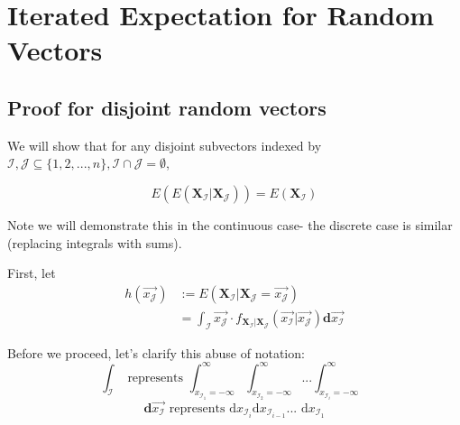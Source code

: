 \documentclass[paper=a4, fontsize=11pt]{scrartcl} %
\numberwithin{equation}{section} %
\numberwithin{figure}{section} %
\numberwithin{table}{section} %
\begin{document}

\section{Iterated Expectation for Random Vectors}

\subsection{Proof for disjoint random vectors}

We will show that for any disjoint subvectors indexed by ${\mathcal{I}}, {\mathcal{J}} \subseteq \{1, 2, ..., n\}, {\mathcal{I}} \cap {\mathcal{J}} = \emptyset$,

\[E(E(\mathbf{X_{\mathcal{I}}} | \mathbf{X_{\mathcal{J}}})) = E(\mathbf{X_{\mathcal{I}}})\]

Note we will demonstrate this in the continuous case- the discrete case is similar (replacing integrals with sums). 

First, let
\begin{align*}
h(\vec{x_{\mathcal{J}}}) &:= E(\mathbf{X_{\mathcal{I}}} | \mathbf{X_{\mathcal{J}}} = \vec{x_{\mathcal{J}}})\\
   &= \int_{\mathbf{{\mathcal{I}}}} \vec{x_{\mathcal{J}}} \cdot f_{ \mathbf{X_{\mathcal{I}} | X_{\mathcal{J}}}}(\vec{x_{\mathcal{I}}} | \vec{x_{\mathcal{J}}}) \mathbf{d}\vec{x_{\mathcal{I}}}
\end{align*}

Before we proceed, let's clarify this abuse of notation:
\[ \int_{\mathbf{{\mathcal{I}}}} \textrm{ represents  } \int_{x_{{\mathcal{I}}_{1}} = -\infty}^\infty \int_{x_{{\mathcal{I}}_{2}} = -\infty}^\infty ... \int_{x_{{\mathcal{I}}_{i}} = -\infty}^\infty \]
\[ \mathbf{d}\vec{x_{\mathcal{I}}} \textrm{ represents  } \textrm{d} x_{{\mathcal{I}}_{i}}  \textrm{d} x_{{\mathcal{I}}_{i-1}} ...  \textrm{ d} x_{{\mathcal{I}}_{1}}\]
\end{document}
